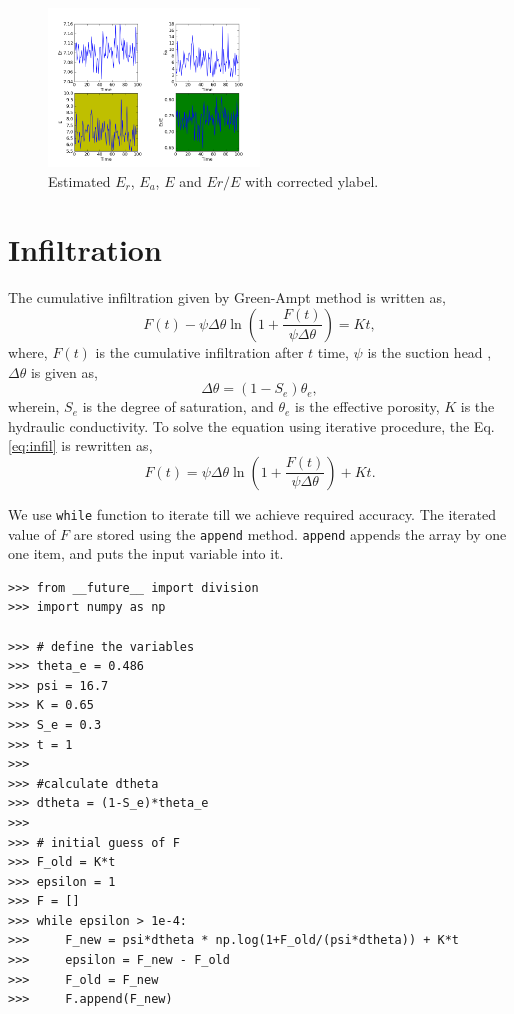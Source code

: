 \documentclass[10pt]{book}
\begin{document}
{\beforefig
\begin{figure}[h!]
  \centering
    \includegraphics[width=0.5\textwidth]{images/corr_E.png}
  \caption{Estimated $E_r$, $E_a$, $E$ and $Er/E$ with corrected ylabel.}
   \label{fig:corr_E}
\end{figure}
\afterfig

\section{Infiltration}
The cumulative infiltration given by Green-Ampt method is written as,
\begin{equation}
\label{eq:infil}
F(t) - \psi \Delta \theta \ln \left(1 + \frac{F(t)}{\psi \Delta \theta} \right) = Kt,
\end{equation}
where, $F(t)$ is the cumulative infiltration after $t$ time, $\psi$ is the suction head , $\Delta \theta$ is given as,
\begin{equation}
\Delta \theta = (1-S_e) \theta_e,
\end{equation}
wherein, $S_e$ is the degree of saturation, and $\theta_e$ is the effective porosity, $K$ is the hydraulic conductivity. To solve the equation using iterative procedure, the Eq. \ref{eq:infil} is rewritten as,
\begin{equation}
F(t) = \psi \Delta \theta \ln \left(1 + \frac{F(t)}{\psi \Delta \theta} \right) + Kt.
\end{equation}

We use \verb"while" function to iterate till we achieve required accuracy. The iterated value of $F$ are stored using the \verb"append" method. \verb"append" appends the array by one one item, and puts the input variable into it. 
\beforeverb \begin{verbatim}
>>> from __future__ import division
>>> import numpy as np

>>> # define the variables
>>> theta_e = 0.486
>>> psi = 16.7
>>> K = 0.65
>>> S_e = 0.3
>>> t = 1
>>> 
>>> #calculate dtheta
>>> dtheta = (1-S_e)*theta_e
>>> 
>>> # initial guess of F
>>> F_old = K*t
>>> epsilon = 1
>>> F = []
>>> while epsilon > 1e-4:
>>>     F_new = psi*dtheta * np.log(1+F_old/(psi*dtheta)) + K*t
>>>     epsilon = F_new - F_old
>>>     F_old = F_new
>>>     F.append(F_new)
\end{verbatim} \afterverb

}
\end{document}
